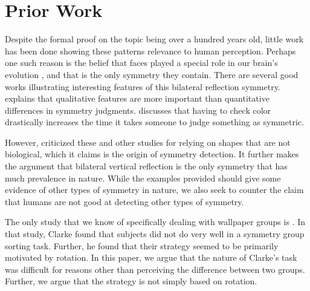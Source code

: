 \section{Prior Work}
Despite the formal proof on the topic being over a hundred years old, little work has been done showing these patterns relevance to human perception. Perhaps one such reason is the belief that faces played a special role in our brain's evolution \citep{ffa}, and that is the only symmetry they contain. There are several good works illustrating interesting features of this bilateral reflection symmetry. \citet{bilateral-qual} explains that qualitative features are more important than quantitative differences in symmetry judgments. \citet{bilateral-color} discusses that having to check color drastically increases the time it takes someone to judge something as symmetric.

However, \citet{bio} criticized these and other studies for relying on shapes that are not biological, which it claims is the origin of symmetry detection. It further makes the argument that bilateral vertical reflection is the only symmetry that has much prevalence in nature. While the examples provided should give some evidence of other types of symmetry in nature, we also seek to counter the claim that humans are not good at detecting other types of symmetry. 

The only study that we know of specifically dealing with wallpaper groups is \citet{clarke}. In that study, Clarke found that subjects did not do very well in a symmetry group sorting task. Further, he found that their strategy seemed to be primarily motivated by rotation. In this paper, we argue that the nature of Clarke's task was difficult for reasons other than perceiving the difference between two groups. Further, we argue that the strategy is not simply based on rotation.
